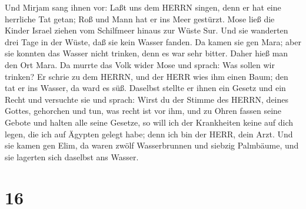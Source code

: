  Und Mirjam sang ihnen vor: Laßt uns dem HERRN singen, denn
er hat eine herrliche Tat getan; Roß und Mann hat er ins Meer gestürzt.
 Mose ließ die Kinder Israel ziehen vom Schilfmeer hinaus
zur Wüste Sur. Und sie wanderten drei Tage in der Wüste, daß sie kein
Wasser fanden.  Da kamen sie gen Mara; aber sie konnten das
Wasser nicht trinken, denn es war sehr bitter. Daher hieß man den Ort
Mara.  Da murrte das Volk wider Mose und sprach: Was sollen
wir trinken?  Er schrie zu dem HERRN, und der HERR wies ihm
einen Baum; den tat er ins Wasser, da ward es süß. Daselbst stellte er
ihnen ein Gesetz und ein Recht und versuchte sie  und
sprach: Wirst du der Stimme des HERRN, deines Gottes, gehorchen und tun,
was recht ist vor ihm, und zu Ohren fassen seine Gebote und halten alle
seine Gesetze, so will ich der Krankheiten keine auf dich legen, die ich
auf Ägypten gelegt habe; denn ich bin der HERR, dein Arzt. 
Und sie kamen gen Elim, da waren zwölf Wasserbrunnen und siebzig
Palmbäume, und sie lagerten sich daselbst ans Wasser.

\hypertarget{section-15}{%
\section{16}\label{section-15}}

